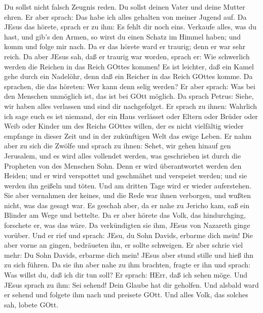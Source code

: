 Du sollst nicht falsch Zeugnis reden. Du sollst deinen Vater und deine
Mutter ehren.  Er aber sprach: Das habe ich alles gehalten
von meiner Jugend auf.  Da JEsus das hörete, sprach er zu
ihm: Es fehlt dir noch eins. Verkaufe alles, was du hast, und gib's den
Armen, so wirst du einen Schatz im Himmel haben; und komm und folge mir
nach.  Da er das hörete ward er traurig; denn er war sehr
reich.  Da aber JEsus sah, daß er traurig war worden,
sprach er: Wie schwerlich werden die Reichen in das Reich GOttes kommen!
 Es ist leichter, daß ein Kamel gehe durch ein Nadelöhr,
denn daß ein Reicher in das Reich GOttes komme.  Da
sprachen, die das höreten: Wer kann denn selig werden?  Er
aber sprach: Was bei den Menschen unmöglich ist, das ist bei GOtt
möglich.  Da sprach Petrus: Siehe, wir haben alles
verlassen und sind dir nachgefolget.  Er sprach zu ihnen:
Wahrlich ich sage euch es ist niemand, der ein Haus verlässet oder
Eltern oder Brüder oder Weib oder Kinder um des Reichs GOttes willen,
 der es nicht vielfältig wieder empfange in dieser Zeit und
in der zukünftigen Welt das ewige Leben.  Er nahm aber zu
sich die Zwölfe und sprach zu ihnen: Sehet, wir gehen hinauf gen
Jerusalem, und es wird alles vollendet werden, was geschrieben ist durch
die Propheten von des Menschen Sohn.  Denn er wird
überantwortet werden den Heiden; und er wird verspottet und geschmähet
und verspeiet werden;  und sie werden ihn geißeln und
töten. Und am dritten Tage wird er wieder auferstehen.  Sie
aber vernahmen der keines, und die Rede war ihnen verborgen, und wußten
nicht, was das gesagt war.  Es geschah aber, da er nahe zu
Jericho kam, saß ein Blinder am Wege und bettelte.  Da er
aber hörete das Volk, das hindurchging, forschete er, was das wäre.
 Da verkündigten sie ihm, JEsus von Nazareth ginge vorüber.
 Und er rief und sprach: JEsu, du Sohn Davids, erbarme dich
mein!  Die aber vorne an gingen, bedräueten ihn, er sollte
schweigen. Er aber schrie viel mehr: Du Sohn Davids, erbarme dich mein!
 JEsus aber stund stille und hieß ihn zu sich führen. Da
sie ihn aber nahe zu ihm brachten, fragte er ihn  und
sprach: Was willst du, daß ich dir tun soll? Er sprach: HErr, daß ich
sehen möge.  Und JEsus sprach zu ihm: Sei sehend! Dein
Glaube hat dir geholfen.  Und alsbald ward er sehend und
folgete ihm nach und preisete GOtt. Und alles Volk, das solches sah,
lobete GOtt.

